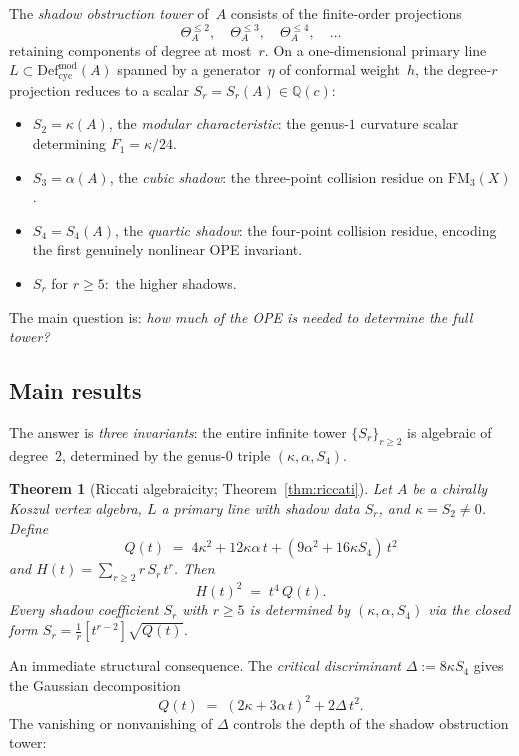 \documentclass[11pt]{article}
\theoremstyle{plain}
\newtheorem{theorem}{Theorem}[section]
\theoremstyle{definition}
\theoremstyle{remark}
\newcommand{\Defcyc}{\mathrm{Def}_{\mathrm{cyc}}}
\newcommand{\FM}{\mathrm{FM}}
\begin{document}
The \emph{shadow obstruction tower} of~$A$ consists of the
finite-order projections
\[
 \Theta_A^{\leq 2},\quad
 \Theta_A^{\leq 3},\quad
 \Theta_A^{\leq 4},\quad
 \ldots
\]
retaining components of degree at most~$r$.
On a one-dimensional primary line $L \subset
\Defcyc^{\mathrm{mod}}(A)$ spanned by a generator~$\eta$
of conformal weight~$h$, the degree-$r$ projection reduces to a
scalar $S_r = S_r(A) \in \mathbb{Q}(c)$:
\begin{itemize}
\item $S_2 = \kappa(A)$, the \emph{modular characteristic}:
 the genus-$1$ curvature scalar determining $F_1 = \kappa/24$.
\item $S_3 = \alpha(A)$, the \emph{cubic shadow}:
 the three-point collision residue on $\FM_3(X)$.
\item $S_4 = S_4(A)$, the \emph{quartic shadow}:
 the four-point collision residue, encoding the first genuinely
 nonlinear OPE invariant.
\item $S_r$ for $r \geq 5$:\ the higher shadows.
\end{itemize}
The main question is: \emph{how much of the OPE is needed to
determine the full tower?}


\subsection{Main results}

The answer is \emph{three invariants}: the entire infinite tower
$\{S_r\}_{r \geq 2}$ is algebraic of degree~$2$, determined by the
genus-$0$ triple $(\kappa, \alpha, S_4)$.

\begin{theorem}[Riccati algebraicity; Theorem~\ref{thm:riccati}]
\label{thm:intro-riccati}
Let $A$ be a chirally Koszul vertex algebra, $L$ a primary line
with shadow data $S_r$, and $\kappa = S_2 \neq 0$. Define
\[
 Q(t)
 \;=\; 4\kappa^2 + 12\kappa\alpha\,t
 + (9\alpha^2 + 16\kappa S_4)\,t^2
\]
and $H(t) = \sum_{r \geq 2} r\,S_r\,t^r$. Then
\begin{equation}\label{eq:intro-algebraicity}
 H(t)^2 \;=\; t^4\,Q(t).
\end{equation}
Every shadow coefficient $S_r$ with $r \geq 5$ is determined by
$(\kappa, \alpha, S_4)$ via the closed form
$S_r = \frac{1}{r}[t^{r-2}]\sqrt{Q(t)}$.
\end{theorem}

An immediate structural consequence.
The \emph{critical discriminant}
$\Delta := 8\kappa S_4$ gives the Gaussian decomposition
\[
 Q(t) \;=\; (2\kappa + 3\alpha\,t)^2 + 2\Delta\,t^2.
\]
The vanishing or nonvanishing of $\Delta$ controls the depth
of the shadow obstruction tower:
\end{document}
